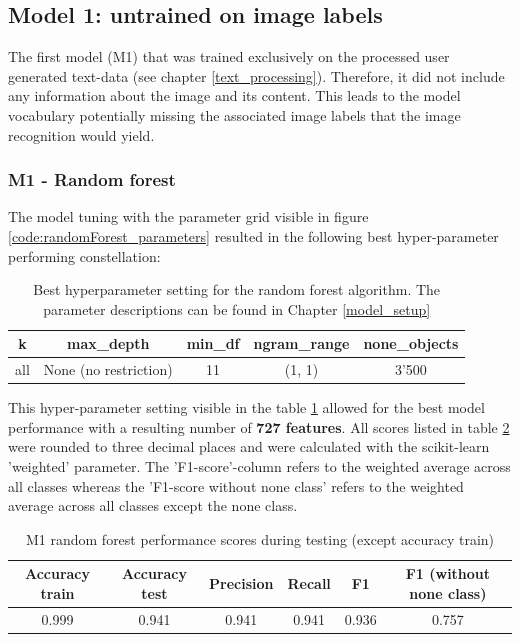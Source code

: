 \subsection{Model 1: untrained on image labels}
The first model (M1) that was trained exclusively on the processed user generated text-data (see chapter \ref{text_processing}). Therefore, it did not include any information about the image and its content. This leads to the model vocabulary potentially missing the associated image labels that the image recognition would yield.

\subsubsection{M1 - Random forest}
The model tuning with the parameter grid visible in figure \ref{code:randomForest_parameters} resulted in the following best hyper-parameter performing constellation:\\

\begin{table}[h!]
\begin{center}
\caption{Best hyperparameter setting for the random forest algorithm. The parameter descriptions can be found in Chapter \ref{model_setup}}\vspace{1ex}
\label{tab:m1_randomForest_bestParams}
\begin{tabular}{ccccc}\hline
k & max\_depth & min\_df & ngram\_range & none\_objects \\ \hline
all & None (no restriction) & 11 & (1, 1) & 3'500 \\ \hline
\end{tabular}
\end{center}
\end{table}

This hyper-parameter setting visible in the table \ref{tab:m1_randomForest_bestParams} allowed for the best model performance with a resulting number of \textbf{727 features}. All scores listed in table \ref{tab:m1_randomForest_bestscores} were rounded to three decimal places and were calculated with the scikit-learn 'weighted' parameter. The 'F1-score'-column refers to the weighted average across all classes whereas the 'F1-score without none class' refers to the weighted average across all classes except the none class.

\begin{table}[h!]
\begin{center}
\caption{M1 random forest performance scores during testing (except accuracy train)}\vspace{1ex}
\label{tab:m1_randomForest_bestscores}
\begin{tabular}{cccccc}\hline
Accuracy train & Accuracy test & Precision & Recall & F1 & F1 (without none class)\\ \hline
0.999 & 0.941 & 0.941 & 0.941 & 0.936 & 0.757 \\ \hline
\end{tabular}
\end{center}
\end{table}

